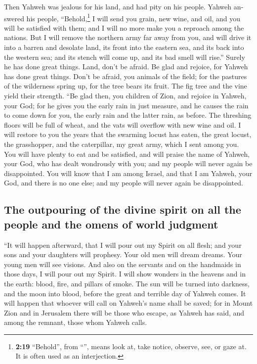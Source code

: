 \begin{paracol}{2}
\begin{otherlanguage}{english}
 Then Yahweh was jealous for his land, and had pity on
his people.  Yahweh answered his people,
``Behold,\footnote{\textbf{2:19} ``Behold'', from ``'',
  means look at, take notice, observe, see, or gaze at. It is often used
  as an interjection.} I will send you grain, new wine, and oil, and you
will be satisfied with them; and I will no more make you a reproach
among the nations.  But I will remove the northern army
far away from you, and will drive it into a barren and desolate land,
its front into the eastern sea, and its back into the western sea; and
its stench will come up, and its bad smell will rise.'' Surely he has
done great things.  Land, don't be afraid. Be glad and
rejoice, for Yahweh has done great things.  Don't be
afraid, you animals of the field; for the pastures of the wilderness
spring up, for the tree bears its fruit. The fig tree and the vine yield
their strength.  ``Be glad then, you children of Zion,
and rejoice in Yahweh, your God; for he gives you the early rain in just
measure, and he causes the rain to come down for you, the early rain and
the latter rain, as before.  The threshing floors will be
full of wheat, and the vats will overflow with new wine and oil.
 I will restore to you the years that the swarming locust
has eaten, the great locust, the grasshopper, and the caterpillar, my
great army, which I sent among you.  You will have plenty
to eat and be satisfied, and will praise the name of Yahweh, your God,
who has dealt wondrously with you; and my people will never again be
disappointed.  You will know that I am among Israel, and
that I am Yahweh, your God, and there is no one else; and my people will
never again be disappointed.

\hypertarget{the-outpouring-of-the-divine-spirit-on-all-the-people-and-the-omens-of-world-judgment}{%
\subsection{The outpouring of the divine spirit on all the people and
the omens of world
judgment}\label{the-outpouring-of-the-divine-spirit-on-all-the-people-and-the-omens-of-world-judgment}}

 ``It will happen afterward, that I will pour out my
Spirit on all flesh; and your sons and your daughters will prophesy.
Your old men will dream dreams. Your young men will see visions.
 And also on the servants and on the handmaids in those
days, I will pour out my Spirit.  I will show wonders in
the heavens and in the earth: blood, fire, and pillars of smoke.
 The sun will be turned into darkness, and the moon into
blood, before the great and terrible day of Yahweh comes.
 It will happen that whoever will call on Yahweh's name
shall be saved; for in Mount Zion and in Jerusalem there will be those
who escape, as Yahweh has said, and among the remnant, those whom Yahweh
calls.


\end{otherlanguage}
\end{paracol}
